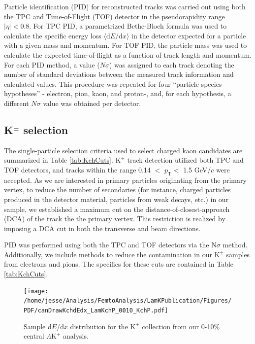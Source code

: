 \documentclass[ALICE,manyauthors]{cernphprep}
\newcommand{\pt}{$p_{\mathrm{T}}$\xspace}
\newcommand{\KchP}{$\mathrm{K^{+}}$\xspace}
\newcommand{\Kpm}{$\mathrm{K^{\pm}}$\xspace}
\newcommand{\LamKchP}{$\Lambda\mathrm{K^{+}}$\xspace}
\begin{document}
Particle identification (PID) for reconstructed tracks was carried out using both the TPC and Time-of-Flight (TOF) detector \cite{Abelev:2014ffa, Akindinov:2013tea} in the pseudorapidity range $|\eta| < 0.8$.  
For TPC PID, a parametrized Bethe-Bloch formula was used to calculate the specific energy loss $\langle \mathrm{d}E/\mathrm{d}x \rangle$ in the detector expected for a particle with a given mass and momentum.  
For TOF PID, the particle mass was used to calculate the expected time-of-flight as a function of track length and momentum.  
For each PID method, a value ($N\sigma$) was assigned to each track denoting the number of standard deviations between the measured track information and calculated values.  
This procedure was repeated for four ``particle species hypotheses'' - electron, pion, kaon, and proton-, and, for each hypothesis, a different $N\sigma$ value was obtained per detector.


\subsection{K$^{\pm}$ selection}
\label{sec:KchSelection}
The single-particle selection criteria used to select charged kaon candidates are summarized in Table \ref{tab:KchCuts}.
\Kpm track detection utilized both TPC and TOF detectors, and tracks within the range 0.14 $<$ \pt $<$ 1.5 GeV/$c$ were accepted.
As we are interested in primary particles originating from the primary vertex, to reduce the number of secondaries (for instance, charged particles produced in the detector material, particles from weak decays, etc.) in our sample, we established a maximum cut on the distance-of-closest-approach (DCA) of the track the the primary vertex.
This restriction is realized by imposing a DCA cut in both the transverse and beam directions.

PID was performed using both the TPC and TOF detectors via the $\mathrm{N}\sigma$ method.  
Additionally, we include methods to reduce the contamination in our \Kpm samples from electrons and pions.  
The specifics for these cuts are contained in Table \ref{tab:KchCuts}.


\begin{figure}[h]
 \centering
 \texttt{[image: /home/jesse/Analysis/FemtoAnalysis/LamKPublication/Figures/PDF/canDrawKchdEdx\_LamKchP\_0010\_KchP.pdf]}%
 \caption{\label{fig:KchPdEdx} Sample d$E$/d$x$ distribution for the \KchP collection from our 0-10\% central \LamKchP analysis.}
\end{figure}
\end{document}
